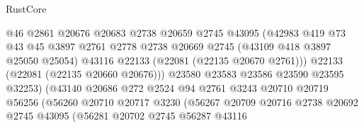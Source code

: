 \begin{lexlean}{RustCore}
\begin{coremodule}
                                      @46
                                      @2861
                                      @20676
                                      @20683
                                      @2738
                                      @20659
                                      @2745
                                      @43095
                                      (@42983
                                        @419
                                        @73
                                        @43
                                        @45
                                        @3897
                                        @2761
                                        @2778
                                        @2738
                                        @20669
                                        @2745
                                        (@43109 @418 @3897 @25050 @25054)
                                        @43116
                                        @22133
                                        (@22081 (@22135 @20670 @2761)))
                                      @22133
                                      (@22081 (@22135 @20660 @20676)))
                                    @23580
                                    @23583
                                    @23586
                                    @23590
                                    @23595
                                    @32253)
                                  (@43140
                                    @20686
                                    @272
                                    @2524
                                    @94
                                    @2761
                                    @3243
                                    @20710
                                    @20719
                                    @56256
                                    (@56260
                                      @20710
                                      @20717
                                      @3230
                                      (@56267
                                        @20709
                                        @20716
                                        @2738
                                        @20692
                                        @2745
                                        @43095
                                        (@56281
                                          @20702
                                          @2745
                                          @56287
                                          @43116

\end{coremodule}
\end{lexlean}
